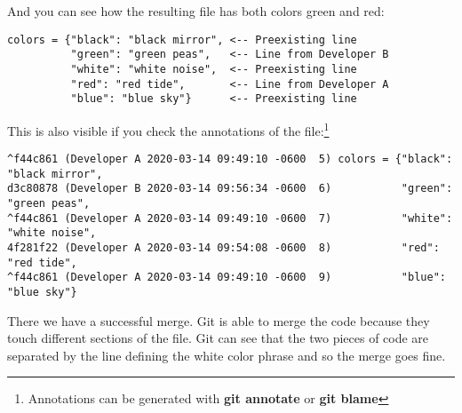 And you can see how the resulting file has both colors green and red:
\begin{lstlisting}[style=code_section_style, firstnumber=5]
colors = {"black": "black mirror", <-- Preexisting line
          "green": "green peas",   <-- Line from Developer B
          "white": "white noise",  <-- Preexisting line
          "red": "red tide",       <-- Line from Developer A
          "blue": "blue sky"}      <-- Preexisting line
\end{lstlisting}

This is also visible if you check the annotations of the file:\footnote{Annotations can be generated with
{\bf git annotate} or {\bf git blame}}

\begin{lstlisting}[style=console_style, basicstyle=\tiny] % FIXME get output that is smaller, the date could be removed)
^f44c861 (Developer A 2020-03-14 09:49:10 -0600  5) colors = {"black": "black mirror",
d3c80878 (Developer B 2020-03-14 09:56:34 -0600  6)           "green": "green peas",
^f44c861 (Developer A 2020-03-14 09:49:10 -0600  7)           "white": "white noise",
4f281f22 (Developer A 2020-03-14 09:54:08 -0600  8)           "red": "red tide",
^f44c861 (Developer A 2020-03-14 09:49:10 -0600  9)           "blue": "blue sky"}
\end{lstlisting}

There we have a successful merge. Git is able to merge the code because they touch different sections of the file.
Git can see that the two pieces of code are separated by the line defining the white color phrase and so the merge
goes fine.

